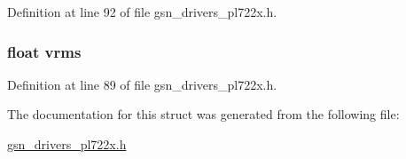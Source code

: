 Definition at line 92 of file gsn\_\-drivers\_\-pl722x.h.

\hypertarget{a00450_a1466cf22de01e2faf786b69e44e4902f}{
\subsubsection[{vrms}]{\setlength{\rightskip}{0pt plus 5cm}float {\bf vrms}}}
\label{a00450_a1466cf22de01e2faf786b69e44e4902f}


Definition at line 89 of file gsn\_\-drivers\_\-pl722x.h.



The documentation for this struct was generated from the following file:\begin{DoxyCompactItemize}
\item 
\hyperlink{a00486}{gsn\_\-drivers\_\-pl722x.h}\end{DoxyCompactItemize}
